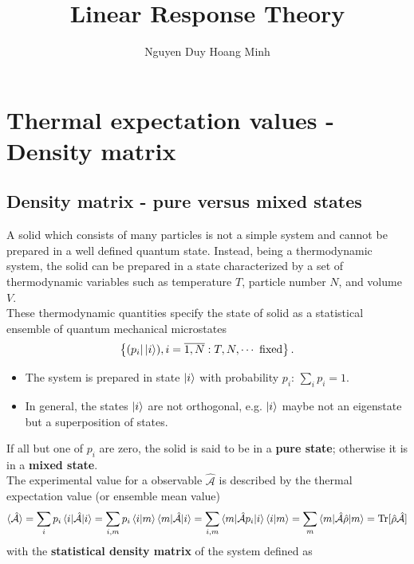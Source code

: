 \documentclass[a4paper,12pts,dvipsnames]{article}
\numberwithin{equation}{section}
\begin{document}
	\title{\textbf{Linear Response Theory}\vspace{-2ex}}
	\author{Nguyen Duy Hoang Minh}
	\date{\vspace{-2ex}}
	\maketitle
	
	\tableofcontents

\section{Thermal expectation values - Density matrix}
\subsection{Density matrix - pure versus mixed states}
A solid which consists of many particles is not a simple system and cannot be prepared in a well defined quantum state. Instead, being a thermodynamic system, the solid can be prepared in a state characterized by a set of thermodynamic variables such as temperature $T$, particle number $N$, and volume $V$.\\
These thermodynamic quantities specify the state of solid as a statistical ensemble of quantum mechanical microstates $$\left\lbrace(p_i|\ket{i}), i = \overline{1,N}: T,N,\cdots\text{ fixed}\right\rbrace.$$
\begin{itemize}
	\item The system is prepared in state $\ket{i}$ with probability $p_i$: $\displaystyle\sum_{i}p_i=1$.
	\item In general, the states $\ket{i}$ are not orthogonal, e.g. $\ket{i}$ maybe not an eigenstate but a superposition of states.
\end{itemize}
If all but one of $p_i$ are zero, the solid is said to be in a \textbf{pure state}; otherwise it is in a \textbf{mixed state}.\\
The experimental value for a observable $\hat{\mathcal{A}}$ is described by the thermal expectation value (or ensemble mean value)
\begin{align}
\braket{\hat{\mathcal{A}}} = \sum_{i}p_i\braket{i|\hat{\mathcal{A}}|i} = \sum_{i,m}p_i\braket{i|m}\braket{m|\hat{\mathcal{A}}|i} = \sum_{i,m}\braket{m|\hat{\mathcal{A}}p_i|i}\braket{i|m} = \sum_m \braket{m|\hat{\mathcal{A}}\hat{\rho}|m} = \text{Tr}[\hat{\rho}\hat{\mathcal{A}}]
\end{align}
with the \textbf{statistical density matrix} of the system defined as
\end{document}
